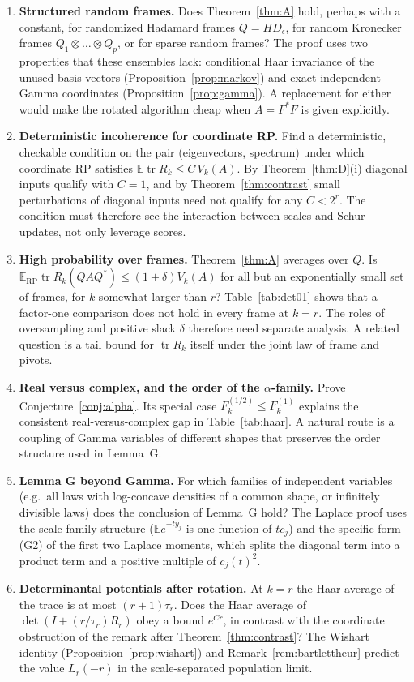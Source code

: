 \documentclass[11pt,a4paper]{article}
\theoremstyle{definition}
\newcommand{\E}{\mathbb{E}}
\newcommand{\tr}{\operatorname{tr}}
\newcommand{\RP}{\mathrm{RP}}
\begin{document}
\begin{enumerate}
\item \textbf{Structured random frames.} Does Theorem~\ref{thm:A} hold, perhaps with a constant, for randomized Hadamard frames $Q=HD_\epsilon$, for random Kronecker frames $Q_1\otimes\dots\otimes Q_p$, or for sparse random frames? The proof uses two properties that these ensembles lack: conditional Haar invariance of the unused basis vectors (Proposition~\ref{prop:markov}) and exact independent-Gamma coordinates (Proposition~\ref{prop:gamma}). A replacement for either would make the rotated algorithm cheap when $A=F^*F$ is given explicitly.

\item \textbf{Deterministic incoherence for coordinate RP.} Find a deterministic, checkable condition on the pair (eigenvectors, spectrum) under which coordinate RP satisfies $\E\tr R_k\le C\,V_k(A)$. By Theorem~\ref{thm:D}(i) diagonal inputs qualify with $C=1$, and by Theorem~\ref{thm:contrast} small perturbations of diagonal inputs need not qualify for any $C<2^r$. The condition must therefore see the interaction between scales and Schur updates, not only leverage scores.

\item \textbf{High probability over frames.} Theorem~\ref{thm:A} averages over $Q$. Is $\E_{\RP}\tr R_k(QAQ^*)\le(1+\delta)V_k(A)$ for all but an exponentially small set of frames, for $k$ somewhat larger than $r$? Table~\ref{tab:det01} shows that a factor-one comparison does not hold in every frame at $k=r$. The roles of oversampling and positive slack $\delta$ therefore need separate analysis. A related question is a tail bound for $\tr R_k$ itself under the joint law of frame and pivots.

\item \textbf{Real versus complex, and the order of the $\alpha$-family.} Prove Conjecture~\ref{conj:alpha}. Its special case $F^{(1/2)}_k\le F^{(1)}_k$ explains the consistent real-versus-complex gap in Table~\ref{tab:haar}. A natural route is a coupling of Gamma variables of different shapes that preserves the order structure used in Lemma~G.

\item \textbf{Lemma G beyond Gamma.} For which families of independent variables (e.g.\ all laws with log-concave densities of a common shape, or infinitely divisible laws) does the conclusion of Lemma~G hold? The Laplace proof uses the scale-family structure ($\E e^{-ty_j}$ is one function of $tc_j$) and the specific form (G2) of the first two Laplace moments, which splits the diagonal term into a product term and a positive multiple of $c_j(t)^2$.

\item \textbf{Determinantal potentials after rotation.} At $k=r$ the Haar average of the trace is at most $(r+1)\tau_r$. Does the Haar average of $\det(I+(r/\tau_r)R_r)$ obey a bound $e^{Cr}$, in contrast with the coordinate obstruction of the remark after Theorem~\ref{thm:contrast}? The Wishart identity (Proposition~\ref{prop:wishart}) and Remark~\ref{rem:bartlettheur} predict the value $L_r(-r)$ in the scale-separated population limit.
\end{enumerate}
\end{document}
